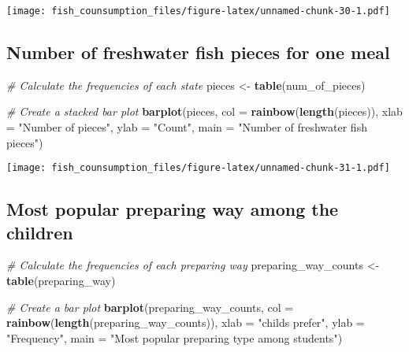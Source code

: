 \documentclass[
]{article}
\newenvironment{Shaded}{\begin{snugshade}}{\end{snugshade}}
\newcommand{\AttributeTok}[1]{\textcolor[rgb]{0.13,0.29,0.53}{#1}}
\newcommand{\CommentTok}[1]{\textcolor[rgb]{0.56,0.35,0.01}{\textit{#1}}}
\newcommand{\FunctionTok}[1]{\textcolor[rgb]{0.13,0.29,0.53}{\textbf{#1}}}
\newcommand{\NormalTok}[1]{#1}
\newcommand{\OtherTok}[1]{\textcolor[rgb]{0.56,0.35,0.01}{#1}}
\newcommand{\StringTok}[1]{\textcolor[rgb]{0.31,0.60,0.02}{#1}}
\begin{document}
\texttt{[image: fish\_counsumption\_files/figure-latex/unnamed-chunk-30-1.pdf]}

\hypertarget{number-of-freshwater-fish-pieces-for-one-meal}{%
\subsection{Number of freshwater fish pieces for one
meal}\label{number-of-freshwater-fish-pieces-for-one-meal}}

\begin{Shaded}
\begin{Highlighting}[]
\CommentTok{\# Calculate the frequencies of each state}
\NormalTok{pieces }\OtherTok{\textless{}{-}} \FunctionTok{table}\NormalTok{(num\_of\_pieces)}

\CommentTok{\# Create a stacked bar plot}
\FunctionTok{barplot}\NormalTok{(pieces, }\AttributeTok{col =} \FunctionTok{rainbow}\NormalTok{(}\FunctionTok{length}\NormalTok{(pieces)), }
        \AttributeTok{xlab =} \StringTok{"Number of pieces"}\NormalTok{, }\AttributeTok{ylab =} \StringTok{"Count"}\NormalTok{, }\AttributeTok{main =} \StringTok{"Number of freshwater fish pieces"}\NormalTok{)}
\end{Highlighting}
\end{Shaded}

\texttt{[image: fish\_counsumption\_files/figure-latex/unnamed-chunk-31-1.pdf]}

\hypertarget{most-popular-preparing-way-among-the-children}{%
\subsection{Most popular preparing way among the
children}\label{most-popular-preparing-way-among-the-children}}

\begin{Shaded}
\begin{Highlighting}[]
\CommentTok{\# Calculate the frequencies of each preparing way}
\NormalTok{preparing\_way\_counts }\OtherTok{\textless{}{-}} \FunctionTok{table}\NormalTok{(preparing\_way)}

\CommentTok{\# Create a bar plot}
\FunctionTok{barplot}\NormalTok{(preparing\_way\_counts, }\AttributeTok{col =} \FunctionTok{rainbow}\NormalTok{(}\FunctionTok{length}\NormalTok{(preparing\_way\_counts)), }
        \AttributeTok{xlab =} \StringTok{"child\textquotesingle{}s prefer"}\NormalTok{, }\AttributeTok{ylab =} \StringTok{"Frequency"}\NormalTok{, }\AttributeTok{main =} \StringTok{"Most popular preparing type among students"}\NormalTok{)}
\end{Highlighting}
\end{Shaded}
\end{document}
